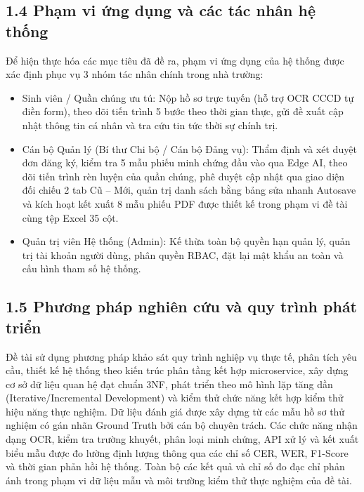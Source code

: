 \documentclass[12pt,a4paper]{report}
\begin{document}
\subsection*{1.4 Phạm vi ứng dụng và các tác nhân hệ thống}
Để hiện thực hóa các mục tiêu đã đề ra, phạm vi ứng dụng của hệ thống được xác định phục vụ 3 nhóm tác nhân chính trong nhà trường:
\begin{itemize}[label=--,leftmargin=*]
  \item Sinh viên / Quần chúng ưu tú: Nộp hồ sơ trực tuyến (hỗ trợ OCR CCCD tự điền form), theo dõi tiến trình 5 bước theo thời gian thực, gửi đề xuất cập nhật thông tin cá nhân và tra cứu tin tức thời sự chính trị.
  \item Cán bộ Quản lý (Bí thư Chi bộ / Cán bộ Đảng vụ): Thẩm định và xét duyệt đơn đăng ký, kiểm tra 5 mẫu phiếu minh chứng đầu vào qua Edge AI, theo dõi tiến trình rèn luyện của quần chúng, phê duyệt cập nhật qua giao diện đối chiếu 2 tab Cũ -- Mới, quản trị danh sách bằng bảng sửa nhanh Autosave và kích hoạt kết xuất 8 mẫu phiếu PDF được thiết kế trong phạm vi đề tài cùng tệp Excel 35 cột.
  \item Quản trị viên Hệ thống (Admin): Kế thừa toàn bộ quyền hạn quản lý, quản trị tài khoản người dùng, phân quyền RBAC, đặt lại mật khẩu an toàn và cấu hình tham số hệ thống.
\end{itemize}

\subsection*{1.5 Phương pháp nghiên cứu và quy trình phát triển}
Đề tài sử dụng phương pháp khảo sát quy trình nghiệp vụ thực tế, phân tích yêu cầu, thiết kế hệ thống theo kiến trúc phân tầng kết hợp microservice, xây dựng cơ sở dữ liệu quan hệ đạt chuẩn 3NF, phát triển theo mô hình lặp tăng dần (Iterative/Incremental Development) và kiểm thử chức năng kết hợp kiểm thử hiệu năng thực nghiệm. Dữ liệu đánh giá được xây dựng từ các mẫu hồ sơ thử nghiệm có gán nhãn Ground Truth bởi cán bộ chuyên trách. Các chức năng nhận dạng OCR, kiểm tra trường khuyết, phân loại minh chứng, API xử lý và kết xuất biểu mẫu được đo lường định lượng thông qua các chỉ số CER, WER, F1-Score và thời gian phản hồi hệ thống. Toàn bộ các kết quả và chỉ số đo đạc chỉ phản ánh trong phạm vi dữ liệu mẫu và môi trường kiểm thử thực nghiệm của đề tài.
\end{document}
